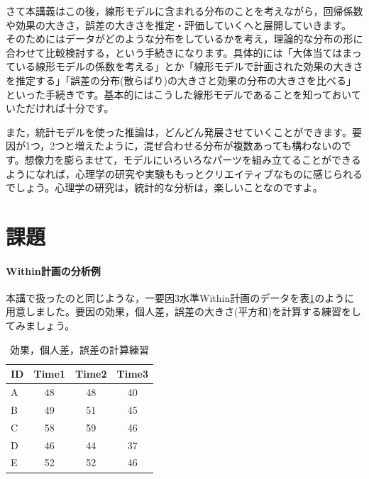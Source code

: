 \documentclass{ltjbook}
\begin{document}
さて本講義はこの後，線形モデルに含まれる分布のことを考えながら，回帰係数や効果の大きさ，誤差の大きさを推定・評価していくへと展開していきます。
そのためにはデータがどのような分布をしているかを考え，理論的な分布の形に合わせて比較検討する，という手続きになります。具体的には「大体当てはまっている線形モデルの係数を考える」とか「線形モデルで計画された効果の大きさを推定する」「誤差の分布(散らばり)の大きさと効果の分布の大きさを比べる」といった手続きです。基本的にはこうした線形モデルであることを知っておいていただければ十分です。

また，統計モデルを使った推論は，どんどん発展させていくことができます。要因が1つ，2つと増えたように，混ぜ合わせる分布が複数あっても構わないのです。想像力を膨らませて，モデルにいろいろなパーツを組み立てることができるようになれば，心理学の研究や実験ももっとクリエイティブなものに感じられるでしょう。心理学の研究は，統計的な分析は，楽しいことなのですよ。




\section{課題}
\paragraph{Within計画の分析例}本講で扱ったのと同じような，一要因3水準Within計画のデータを表\ref{m14_example}のように用意しました。要因の効果，個人差，誤差の大きさ(平方和)を計算する練習をしてみましょう。
\begin{table}[ht]
	\centering
	\caption{効果，個人差，誤差の計算練習}
	\begin{tabular}{l|ccc}
		\hline
		ID & Time1 & Time2 & Time3 \\
		\hline
		A  & 48    & 48    & 40    \\
		B  & 49    & 51    & 45    \\
		C  & 58    & 59    & 46    \\
		D  & 46    & 44    & 37    \\
		E  & 52    & 52    & 46    \\
		\hline
	\end{tabular}
	\label{m14_example}
\end{table}
\end{document}

